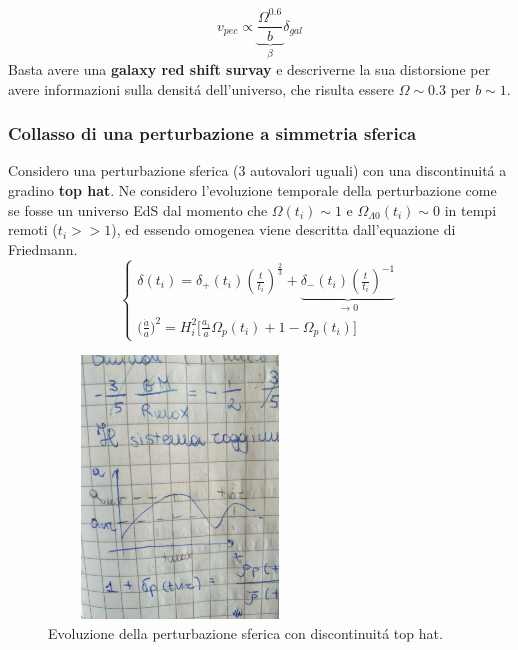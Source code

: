 \documentclass[12pt, a4paper]{article}
\begin{document}
\begin{equation}
v_{pec}\propto \underbrace{\frac{\Omega^{0.6}}{b}}_{\beta}\delta_{gal}
\end{equation}
Basta avere una \textbf{galaxy red shift survay} e descriverne la sua distorsione per avere informazioni sulla densit\'{a} dell'universo, che risulta essere $\Omega\sim 0.3$ per $b\sim 1$.
\subsubsection{Collasso di una perturbazione a simmetria sferica}
Considero una perturbazione sferica (3 autovalori uguali) con una discontinuit\'{a} a gradino \textbf{top hat}. Ne considero l'evoluzione temporale della perturbazione come se fosse un universo EdS dal momento che $\Omega(t_i)\sim1$ e $\Omega_{\Lambda0}(t_i)\sim 0$ in tempi remoti ($t_i>>1$), ed essendo omogenea viene descritta dall'equazione di Friedmann.
\begin{equation}
\begin{cases}
\delta(t_i)=\delta_{+}(t_i) (\frac{t}{t_i})^{\frac{2}{3}}+\underbrace{\delta_{-}(t_i)(\frac{t}{t_i})^{-1}}_{\rightarrow 0}
\\
\big(\frac{\dot{a}}{a}\big)^2=H_i^2\big[\frac{a_i}{a}\Omega_p(t_i)+1-\Omega_p(t_i)\big]
\end{cases}
\end{equation}
\begin{figure}[htp]
\centering
\includegraphics[width=7cm, height=7cm]{images/tophat.jpeg}
\caption{Evoluzione della perturbazione sferica con discontinuit\'{a} top hat.}
\label{fig:tophat}
\end{figure}
\end{document}
